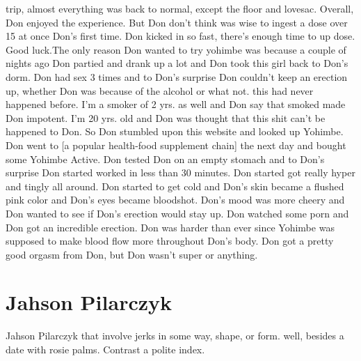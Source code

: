 \documentclass[12pt]{book}
\begin{document}
trip, almost everything was back to normal, except the floor and lovesac. Overall, Don enjoyed the experience. But Don don't think was wise to ingest a dose over 15 at once Don's first time. Don kicked in so fast, there's enough time to up dose. Good luck.The only reason Don wanted to try yohimbe was because a couple of nights ago Don partied and drank up a lot and Don took this girl back to Don's dorm. Don had sex 3 times and to Don's surprise Don couldn't keep an erection up, whether Don was because of the alcohol or what not. this had never happened before. I'm a smoker of 2 yrs. as well and Don say that smoked made Don impotent. I'm 20 yrs. old and Don was thought that this shit can't be happened to Don. So Don stumbled upon this website and looked up Yohimbe. Don went to [a popular health-food supplement chain] the next day and bought some Yohimbe Active. Don tested Don on an empty stomach and to Don's surprise Don started worked in less than 30 minutes. Don started got really hyper and tingly all around. Don started to get cold and Don's skin became a flushed pink color and Don's eyes became bloodshot. Don's mood was more cheery and Don wanted to see if Don's erection would stay up. Don watched some porn and Don got an incredible erection. Don was harder than ever since Yohimbe was supposed to make blood flow more throughout Don's body. Don got a pretty good orgasm from Don, but Don wasn't super or anything.



\chapter{Jahson Pilarczyk}

Jahson Pilarczyk that involve jerks in some way, shape, or form. well, besides a date with rosie palms. Contrast a polite index.
\end{document}
